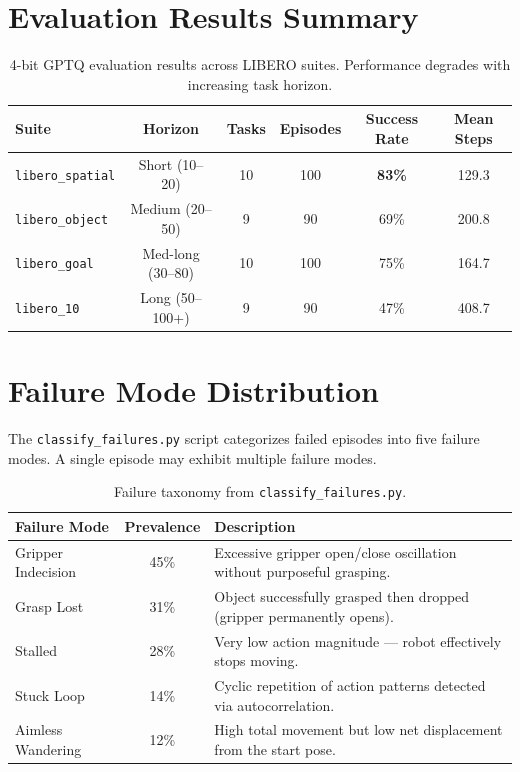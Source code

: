 \documentclass[11pt,a4paper]{article}
\begin{document}
\section{Evaluation Results Summary}

\begin{table}[h]
\centering
\begin{tabular}{@{}lccccc@{}}
\toprule
\textbf{Suite} & \textbf{Horizon} & \textbf{Tasks} & \textbf{Episodes} & \textbf{Success Rate} & \textbf{Mean Steps} \\
\midrule
\texttt{libero\_spatial} & Short (10--20)       & 10 & 100 & \textbf{83\%} & 129.3 \\
\texttt{libero\_object}  & Medium (20--50)      &  9 &  90 & 69\%          & 200.8 \\
\texttt{libero\_goal}    & Med-long (30--80)    & 10 & 100 & 75\%          & 164.7 \\
\texttt{libero\_10}      & Long (50--100+)      &  9 &  90 & 47\%          & 408.7 \\
\bottomrule
\end{tabular}
\caption{4-bit GPTQ evaluation results across LIBERO suites. Performance degrades with increasing task horizon.}
\end{table}

\section{Failure Mode Distribution}

The \texttt{classify\_failures.py} script categorizes failed episodes into five failure modes. A single episode may exhibit multiple failure modes.

\begin{table}[h]
\centering
\begin{tabular}{@{}lcp{8cm}@{}}
\toprule
\textbf{Failure Mode} & \textbf{Prevalence} & \textbf{Description} \\
\midrule
Gripper Indecision & 45\% & Excessive gripper open/close oscillation without purposeful grasping. \\
Grasp Lost         & 31\% & Object successfully grasped then dropped (gripper permanently opens). \\
Stalled            & 28\% & Very low action magnitude --- robot effectively stops moving. \\
Stuck Loop         & 14\% & Cyclic repetition of action patterns detected via autocorrelation. \\
Aimless Wandering  & 12\% & High total movement but low net displacement from the start pose. \\
\bottomrule
\end{tabular}
\caption{Failure taxonomy from \texttt{classify\_failures.py}.}
\end{table}
\end{document}
